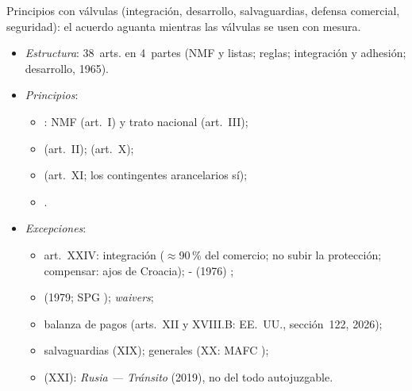 \documentclass{article}
\begin{document}
\begin{columnas}
\begin{ideaclave}
Principios con válvulas (integración, desarrollo, salvaguardias, defensa comercial, seguridad): el acuerdo aguanta mientras las válvulas se usen con mesura.
\end{ideaclave}

\begin{itemize}
\item \emph{Estructura}: 38~arts. en 4~partes (NMF y listas; reglas; integración y adhesión; desarrollo, 1965).
\item \emph{Principios}:
  \begin{itemize}
  \item {}: NMF (art.~I) y trato nacional (art.~III);
  \item {} (art.~II);  (art.~X);
  \item {} (art.~XI; los contingentes arancelarios sí);
  \item {}.
  \end{itemize}
\item \emph{Excepciones}:
  \begin{itemize}
  \item art.~XXIV: integración ($\approx$90\,\% del comercio; no subir la protección; compensar: ajos de Croacia); - (1976) ;
  \item {} (1979; SPG ); \emph{waivers};
  \item balanza de pagos (arts.~XII y XVIII.B: EE.~UU., sección~122, 2026);
  \item salvaguardias (XIX); generales (XX: MAFC );
  \item {} (XXI): \emph{Rusia — Tránsito} (2019), no del todo autojuzgable.
  \end{itemize}
\end{itemize}
\begin{itemize}

\end{itemize}
\end{columnas}
\end{document}
